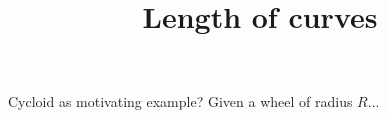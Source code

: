 \documentclass{ximera}
\title[Dig-In:]{Length of curves}
\begin{document}
\begin{abstract}
\end{abstract}
\maketitle

Cycloid as motivating example? Given a wheel of radius $R$... 
\end{document}
